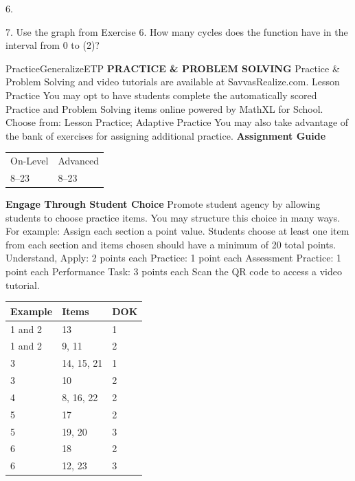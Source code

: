 \documentclass{article}
\newenvironment{item-analysis}{}{}      %
\newenvironment{concept-summary}{}{}    %
\newenvironment{te-addendum}[2]{}{}     %
\newcommand{\answer}[1]{}               %
\newcommand{\placeholder}[2]{}          %
\newcommand{\te}[1]{}                   %
\begin{document}
\begin{concept-summary}
\placeholder{graph}{Summary5 red sine on arrowed x,y grid, O; x labels-2pi,-pi,pi,2pi, gridpi/2; y labels-2,2, grid1, window-5pi/2 to5pi/2,-4 to4. Amplitude3, periodpi, rising through origin, peaks(pi/4+kpi,3), troughs(3pi/4+kpi,-3), curve end arrows.}
\answer{period: (\pi); amplitude:3}
6.
\placeholder{graph}{Summary6 red sine on arrowed x,y grid, O; x labels-4pi,-2pi,2pi,4pi, gridpi; y labels-0.5,0.5, grid1/4; window-5pi to5pi,-3/4 to3/4. Curve rises through origin; maxima(pi,1/2),(-3pi,1/2), minima(-pi,-1/2),(3pi,-1/2), period4pi; end arrows.}
\answer{period: (4\pi); amplitude:(\frac12)}
7. Use the graph from Exercise 6. How many cycles does the function have in the interval from 0 to (2\pi)?
\answer{(\frac12)}
\end{concept-summary}
\begin{te-addendum}{Practice}{GeneralizeETP}
\textbf{PRACTICE \& PROBLEM SOLVING}
Practice \& Problem Solving and video tutorials are available at SavvasRealize.com.
Lesson Practice You may opt to have students complete the automatically scored Practice and Problem Solving items online powered by MathXL for School.
Choose from: Lesson Practice; Adaptive Practice
You may also take advantage of the bank of exercises for assigning additional practice.
\textbf{Assignment Guide}
\begin{tabular}{ll}
On-Level & Advanced \\
8--23 & 8--23 \\
\end{tabular}
\textbf{Engage Through Student Choice}
Promote student agency by allowing students to choose practice items. You may structure this choice in many ways. For example:
Assign each section a point value. Students choose at least one item from each section and items chosen should have a minimum of 20 total points.
Understand, Apply: 2 points each
Practice: 1 point each
Assessment Practice: 1 point each
Performance Task: 3 points each
Scan the QR code to access a video tutorial.
\end{te-addendum}
\begin{item-analysis}
\begin{tabular}{lll}
\toprule
Example & Items & DOK \\
\midrule
1 and 2 & 13 & 1 \\
1 and 2 & 9, 11 & 2 \\
3 & 14, 15, 21 & 1 \\
3 & 10 & 2 \\
4 & 8, 16, 22 & 2 \\
5 & 17 & 2 \\
5 & 19, 20 & 3 \\
6 & 18 & 2 \\
6 & 12, 23 & 3 \\
\bottomrule
\end{tabular}
\te{Printed first example cell is "1 and 2" across two DOK rows. Retained literally; checker accepts only numeric example cells and therefore reports items9,11,13 as unmapped. Their DOK values here are directly printed, not inferred.}
\end{item-analysis}
\end{document}
